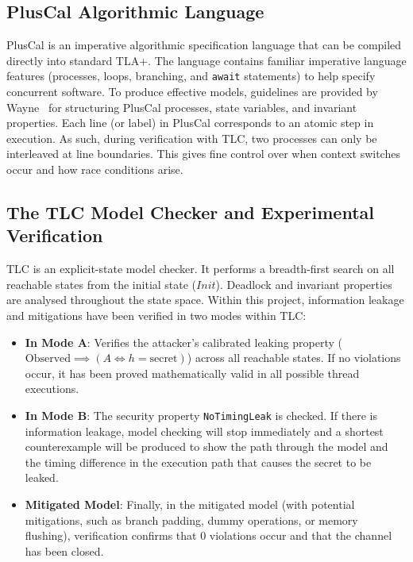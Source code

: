 \documentclass[a4paper,12pt]{report}
\begin{document}
\subsection{PlusCal Algorithmic Language}
PlusCal is an imperative algorithmic specification language that can be compiled directly into standard TLA+. The language contains familiar imperative language features (processes, loops, branching, and \texttt{await} statements) to help specify concurrent software. To produce effective models, guidelines are provided by Wayne~\cite{wayne2018practical} for structuring PlusCal processes, state variables, and invariant properties. Each line (or label) in PlusCal corresponds to an atomic step in execution. As such, during verification with TLC, two processes can only be interleaved at line boundaries. This gives fine control over when context switches occur and how race conditions arise.

\subsection{The TLC Model Checker and Experimental Verification}
TLC is an explicit-state model checker. It performs a breadth-first search on all reachable states from the initial state ($Init$). Deadlock and invariant properties are analysed throughout the state space. Within this project, information leakage and mitigations have been verified in two modes within TLC:
\begin{itemize}[itemsep=0.25em, topsep=0.15em]
    \item \textbf{In Mode A}: Verifies the attacker's calibrated leaking property ($\text{Observed} \implies (A \iff h = \text{secret})$) across all reachable states. If no violations occur, it has been proved mathematically valid in all possible thread executions.
    \item \textbf{In Mode B}: The security property \texttt{NoTimingLeak} is checked. If there is information leakage, model checking will stop immediately and a shortest counterexample will be produced to show the path through the model and the timing difference in the execution path that causes the secret to be leaked.
    \item \textbf{Mitigated Model}: Finally, in the mitigated model (with potential mitigations, such as branch padding, dummy operations, or memory flushing), verification confirms that 0 violations occur and that the channel has been closed.
\end{itemize}
\end{document}
